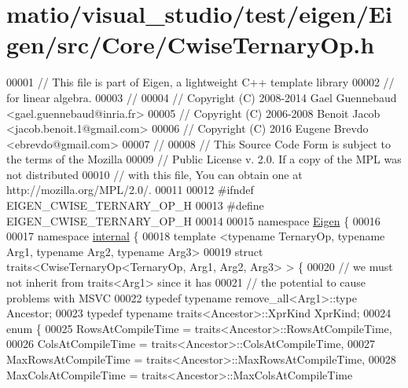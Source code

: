\hypertarget{matio_2visual__studio_2test_2eigen_2_eigen_2src_2_core_2_cwise_ternary_op_8h_source}{}\section{matio/visual\+\_\+studio/test/eigen/\+Eigen/src/\+Core/\+Cwise\+Ternary\+Op.h}
\label{matio_2visual__studio_2test_2eigen_2_eigen_2src_2_core_2_cwise_ternary_op_8h_source}

\begin{DoxyCode}
00001 \textcolor{comment}{// This file is part of Eigen, a lightweight C++ template library}
00002 \textcolor{comment}{// for linear algebra.}
00003 \textcolor{comment}{//}
00004 \textcolor{comment}{// Copyright (C) 2008-2014 Gael Guennebaud <gael.guennebaud@inria.fr>}
00005 \textcolor{comment}{// Copyright (C) 2006-2008 Benoit Jacob <jacob.benoit.1@gmail.com>}
00006 \textcolor{comment}{// Copyright (C) 2016 Eugene Brevdo <ebrevdo@gmail.com>}
00007 \textcolor{comment}{//}
00008 \textcolor{comment}{// This Source Code Form is subject to the terms of the Mozilla}
00009 \textcolor{comment}{// Public License v. 2.0. If a copy of the MPL was not distributed}
00010 \textcolor{comment}{// with this file, You can obtain one at http://mozilla.org/MPL/2.0/.}
00011 
00012 \textcolor{preprocessor}{#ifndef EIGEN\_CWISE\_TERNARY\_OP\_H}
00013 \textcolor{preprocessor}{#define EIGEN\_CWISE\_TERNARY\_OP\_H}
00014 
00015 \textcolor{keyword}{namespace }\hyperlink{namespace_eigen}{Eigen} \{
00016 
00017 \textcolor{keyword}{namespace }\hyperlink{namespaceinternal}{internal} \{
00018 \textcolor{keyword}{template} <\textcolor{keyword}{typename} TernaryOp, \textcolor{keyword}{typename} Arg1, \textcolor{keyword}{typename} Arg2, \textcolor{keyword}{typename} Arg3>
00019 \textcolor{keyword}{struct }traits<CwiseTernaryOp<TernaryOp, Arg1, Arg2, Arg3> > \{
00020   \textcolor{comment}{// we must not inherit from traits<Arg1> since it has}
00021   \textcolor{comment}{// the potential to cause problems with MSVC}
00022   \textcolor{keyword}{typedef} \textcolor{keyword}{typename} remove\_all<Arg1>::type Ancestor;
00023   \textcolor{keyword}{typedef} \textcolor{keyword}{typename} traits<Ancestor>::XprKind XprKind;
00024   \textcolor{keyword}{enum} \{
00025     RowsAtCompileTime = traits<Ancestor>::RowsAtCompileTime,
00026     ColsAtCompileTime = traits<Ancestor>::ColsAtCompileTime,
00027     MaxRowsAtCompileTime = traits<Ancestor>::MaxRowsAtCompileTime,
00028     MaxColsAtCompileTime = traits<Ancestor>::MaxColsAtCompileTime

\end{DoxyCode}
